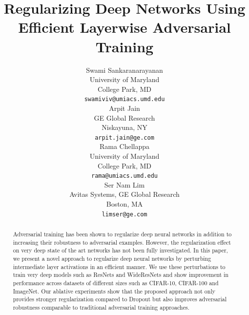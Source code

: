 \documentclass[letterpaper]{article} %
\begin{document}
\title{Regularizing Deep Networks Using Efficient Layerwise Adversarial Training}
\author{
  Swami Sankaranarayanan \\
  University of Maryland\\
  College Park, MD\\
  \texttt{swamiviv@umiacs.umd.edu} \\
  \And
  Arpit Jain \\
  GE Global Research\\
  Niskayuna, NY\\
  \texttt{arpit.jain@ge.com} \\
  \AND
  Rama Chellappa \\
  University of Maryland\\
  College Park, MD\\
  \texttt{rama@umiacs.umd.edu} \\
  \And
  Ser Nam Lim \\
  Avitas Systems,
  GE Global Research\\
  Boston, MA\\
  \texttt{limser@ge.com} \\
}

\maketitle
\begin{abstract}

Adversarial training has been shown to regularize deep neural networks in addition to increasing their robustness to adversarial examples. However, the regularization effect on very deep state of the art networks has not been fully investigated. In this paper, we present a novel approach to regularize deep neural networks by perturbing intermediate layer activations in an efficient manner. We use these perturbations to train very deep models such as ResNets and WideResNets and show improvement in performance across datasets of different sizes such as CIFAR-10, CIFAR-100 and ImageNet. Our ablative experiments show that the proposed approach not only provides stronger regularization compared to Dropout but also improves adversarial robustness comparable to traditional adversarial training approaches.
\end{abstract}
\end{document}

